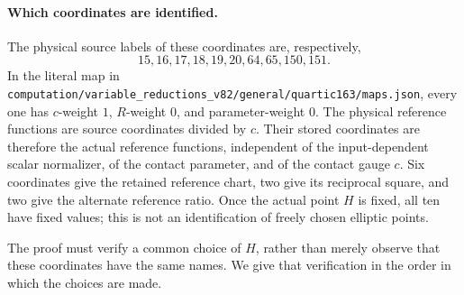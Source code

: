 \documentclass[11pt]{article}
\begin{document}
\paragraph{Which coordinates are identified.}
The physical source labels of these coordinates are, respectively,
\[
                 15,16,17,18,19,20,64,65,150,151.
\]
In the literal map in
\nolinkurl{computation/variable_reductions_v82/general/quartic163/maps.json},
every one has $c$-weight $1$, $R$-weight $0$, and parameter-weight $0$.
The physical reference functions are source coordinates divided by
$c$.  Their stored coordinates are therefore the actual reference
functions, independent of the input-dependent scalar normalizer, of
the contact parameter, and of the contact gauge $c$.  Six coordinates
give the retained reference chart, two give its reciprocal square,
and two give the alternate reference ratio.  Once the actual point
$H$ is fixed, all ten have fixed values; this is not an identification
of freely chosen elliptic points.

The proof must verify a common choice of $H$, rather than merely
observe that these coordinates have the same names.  We give that
verification in the order in which the choices are made.
\end{document}
